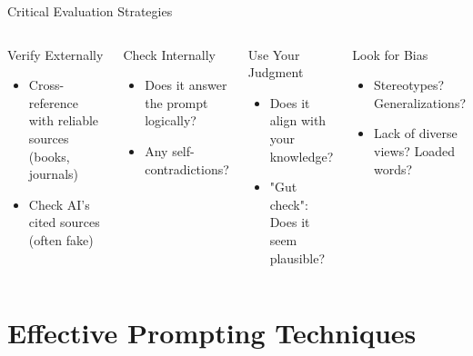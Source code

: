 \documentclass{beamer}
\begin{document}
\begin{frame}{Critical Evaluation Strategies}
\begin{columns}
\begin{block}{Verify Externally}
\begin{itemize}
\item Cross-reference with reliable sources (books, journals)
\item Check AI's cited sources (often fake)
\end{itemize}
\end{block}
\pause 
\begin{block}{Check Internally}
\begin{itemize}
\item Does it answer the prompt logically?
\item Any self-contradictions?
\end{itemize}
\end{block}
\pause 
\begin{block}{Use Your Judgment}
\begin{itemize}
\item Does it align with your knowledge?
\item "Gut check": Does it seem plausible?
\end{itemize}
\end{block}
\pause 
\begin{block}{Look for Bias}
\begin{itemize}
\item Stereotypes? Generalizations?
\item Lack of diverse views? Loaded words?
\end{itemize}
\end{block}
\end{columns}
\end{frame}

\section{Effective Prompting Techniques}
\end{document}
